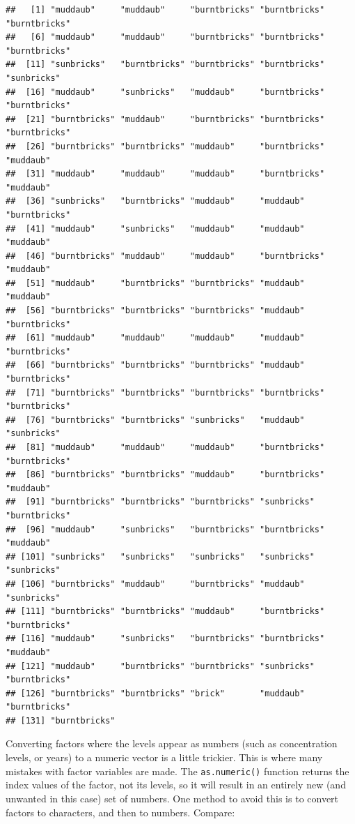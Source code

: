 \documentclass[]{book}
\begin{document}
\begin{verbatim}
##   [1] "muddaub"     "muddaub"     "burntbricks" "burntbricks" "burntbricks"
##   [6] "muddaub"     "muddaub"     "burntbricks" "burntbricks" "burntbricks"
##  [11] "sunbricks"   "burntbricks" "burntbricks" "burntbricks" "sunbricks"  
##  [16] "muddaub"     "sunbricks"   "muddaub"     "burntbricks" "burntbricks"
##  [21] "burntbricks" "muddaub"     "burntbricks" "burntbricks" "burntbricks"
##  [26] "burntbricks" "burntbricks" "muddaub"     "burntbricks" "muddaub"    
##  [31] "muddaub"     "muddaub"     "muddaub"     "burntbricks" "muddaub"    
##  [36] "sunbricks"   "burntbricks" "muddaub"     "muddaub"     "burntbricks"
##  [41] "muddaub"     "sunbricks"   "muddaub"     "muddaub"     "muddaub"    
##  [46] "burntbricks" "muddaub"     "muddaub"     "burntbricks" "muddaub"    
##  [51] "muddaub"     "burntbricks" "burntbricks" "muddaub"     "muddaub"    
##  [56] "burntbricks" "burntbricks" "burntbricks" "muddaub"     "burntbricks"
##  [61] "muddaub"     "muddaub"     "muddaub"     "muddaub"     "burntbricks"
##  [66] "burntbricks" "burntbricks" "burntbricks" "muddaub"     "burntbricks"
##  [71] "burntbricks" "burntbricks" "burntbricks" "burntbricks" "burntbricks"
##  [76] "burntbricks" "burntbricks" "sunbricks"   "muddaub"     "sunbricks"  
##  [81] "muddaub"     "muddaub"     "muddaub"     "burntbricks" "burntbricks"
##  [86] "burntbricks" "burntbricks" "muddaub"     "burntbricks" "muddaub"    
##  [91] "burntbricks" "burntbricks" "burntbricks" "sunbricks"   "burntbricks"
##  [96] "muddaub"     "sunbricks"   "burntbricks" "burntbricks" "muddaub"    
## [101] "sunbricks"   "sunbricks"   "sunbricks"   "sunbricks"   "sunbricks"  
## [106] "burntbricks" "muddaub"     "burntbricks" "muddaub"     "sunbricks"  
## [111] "burntbricks" "burntbricks" "muddaub"     "burntbricks" "burntbricks"
## [116] "muddaub"     "sunbricks"   "burntbricks" "burntbricks" "muddaub"    
## [121] "muddaub"     "burntbricks" "burntbricks" "sunbricks"   "burntbricks"
## [126] "burntbricks" "burntbricks" "brick"       "muddaub"     "burntbricks"
## [131] "burntbricks"
\end{verbatim}

Converting factors where the levels appear as numbers (such as
concentration levels, or years) to a numeric vector is a little
trickier. This is where many mistakes with factor variables are made.
The \texttt{as.numeric()} function returns the index values of the
factor, not its levels, so it will result in an entirely new (and
unwanted in this case) set of numbers. One method to avoid this is to
convert factors to characters, and then to numbers. Compare:
\end{document}
